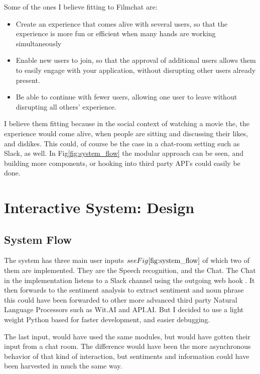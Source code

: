 \documentclass[11pt,fleqn]{book} %
\begin{document}
Some of the ones I believe fitting to Filmchat are:
\begin{itemize}
\item Create an experience that comes alive with several users, so that the experience
is more fun or efficient when many hands are working simultaneously
\item Enable new users to join, so that the approval of additional users allows them
to easily engage with your application, without disrupting other users already
present.
\item Be able to continue with fewer users, allowing one user to leave without disrupting all others’ experience.
\end{itemize}
I believe them fitting because in the social context of watching a movie the, the experience would come alive, when people are sitting and discussing their likes, and dislikes.
This could, of course be the case in a chat-room setting such as Slack, as well. In Fig\ref{fig:system_flow} the modular approach can be seen, and building more components, or hooking into third party API's could easily be done. 

\chapter{Interactive System: Design}
\section{System Flow}
The system has three main user inputs \(see Fig\ref{fig:system_flow}\) of which two of them are implemented. They are the Speech recognition, and the Chat. The Chat in the implementation listens to a Slack channel using the outgoing web hook \cite{SlackOutgoingSlack}. It then forwards to the sentiment analysis to extract sentiment and noun phrase \cite{WikipediaNounPhrase} this could have been forwarded to other more advanced third party Natural Language Processors\cite{Wikipedia2017NaturalProcessing} such as Wit.AI\cite{Wit.aiWit.ai} and API.AI\cite{API.AIConversationalAPI.AI}. But I decided to use a light weight Python based for faster development, and easier debugging.

The last input, would have used the same modules, but would have gotten their input from a chat room. The difference would have been the more asynchronous behavior of that kind of interaction, but sentiments and information could have been harvested in much the same way.
\end{document}

